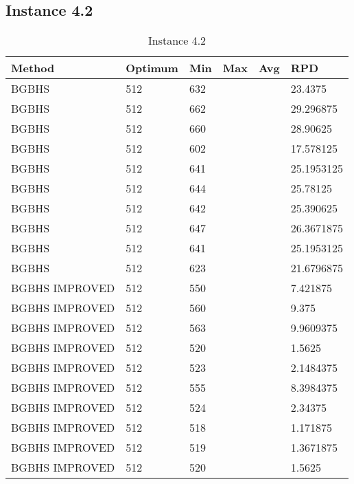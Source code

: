 \newpage
\subsection{Instance 4.2}

\begin{table}[H]
\centering
\begin{tabular}{ | l | l | l | l | l | l | }
\hline
	Method & Optimum & Min & Max & Avg & RPD \\ \hline
	BGBHS & 512 & 632 &  &  & 23.4375 \\ \hline
	BGBHS & 512 & 662 &  &  & 29.296875 \\ \hline
	BGBHS & 512 & 660 &  &  & 28.90625 \\ \hline
	BGBHS & 512 & 602 &  &  & 17.578125 \\ \hline
	BGBHS & 512 & 641 &  &  & 25.1953125 \\ \hline
	BGBHS & 512 & 644 &  &  & 25.78125 \\ \hline
	BGBHS & 512 & 642 &  &  & 25.390625 \\ \hline
	BGBHS & 512 & 647 &  &  & 26.3671875 \\ \hline
	BGBHS & 512 & 641 &  &  & 25.1953125 \\ \hline
	BGBHS & 512 & 623 &  &  & 21.6796875 \\ \hline
	BGBHS IMPROVED & 512 & 550 &  &  & 7.421875 \\ \hline
	BGBHS IMPROVED & 512 & 560 &  &  & 9.375 \\ \hline
	BGBHS IMPROVED & 512 & 563 &  &  & 9.9609375 \\ \hline
	BGBHS IMPROVED & 512 & 520 &  &  & 1.5625 \\ \hline
	BGBHS IMPROVED & 512 & 523 &  &  & 2.1484375 \\ \hline
	BGBHS IMPROVED & 512 & 555 &  &  & 8.3984375 \\ \hline
	BGBHS IMPROVED & 512 & 524 &  &  & 2.34375 \\ \hline
	BGBHS IMPROVED & 512 & 518 &  &  & 1.171875 \\ \hline
	BGBHS IMPROVED & 512 & 519 &  &  & 1.3671875 \\ \hline
	BGBHS IMPROVED & 512 & 520 &  &  & 1.5625 \\ \hline
\end{tabular}
\caption{Instance 4.2}
\label{tblscp42}
\end{table}

\newpage

